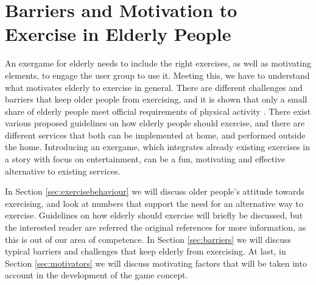 \chapter{Barriers and Motivation to Exercise in Elderly People}
\label{chap:olderexercise}

An exergame for elderly needs to include the right exercises, as well as motivating elements, to engage the user group to use it. Meeting this, we have to understand what motivates elderly to exercise in general. There are different challenges and barriers that keep older people from exercising, and it is shown that only a small share of elderly people meet official requirements of physical activity \cite{statistikknorge12}. There exist various proposed guidelines on how elderly people should exercise, and there are different services that both can be implemented at home, and performed outside the home. Introducing an exergame, which integrates already existing exercises in a story with focus on entertainment, can be a fun, motivating and effective alternative to existing services.  

In Section \ref{sec:exercisebehaviour} we will discuss older people's attitude towards exercising, and look at numbers that support the need for an alternative way to exercise. Guidelines on how elderly should exercise will briefly be discussed, but the interested reader are referred the original references for more information, as this is out of our area of competence. In Section \ref{sec:barriers} we will discuss typical barriers and challenges that keep elderly from exercising. At last, in Section \ref{sec:motivators} we will discuss motivating factors that will be taken into account in the development of the game concept.  

